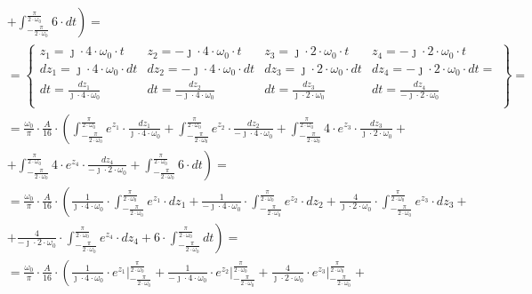 \begin{task}
\begin{align*}
&+\left. \int_{-\frac{\pi}{2\cdot\omega_0}}^{\frac{\pi}{2\cdot\omega_0}} 6\cdot dt \right)=\\
&=\begin{Bmatrix}
z_1=\jmath \cdot 4 \cdot \omega_0 \cdot t & z_2= - \jmath \cdot 4 \cdot \omega_0 \cdot t & z_3=\jmath \cdot 2 \cdot \omega_0 \cdot t & z_4= - \jmath \cdot 2 \cdot \omega_0 \cdot t \\
dz_1=\jmath \cdot 4 \cdot \omega_0 \cdot dt & dz_2= - \jmath \cdot 4 \cdot \omega_0 \cdot dt & dz_3=\jmath \cdot 2 \cdot \omega_0 \cdot dt & dz_4= - \jmath \cdot 2 \cdot \omega_0 \cdot dt=\\
dt=\frac{dz_1}{\jmath \cdot 4 \cdot \omega_0} & dt=\frac{dz_2}{- \jmath \cdot 4 \cdot \omega_0} & dt=\frac{dz_3}{\jmath \cdot 2 \cdot \omega_0} & dt=\frac{dz_4}{- \jmath \cdot 2 \cdot \omega_0} \\
\end{Bmatrix}=\\
&=\frac{\omega_0}{\pi} \cdot \frac{A}{16} \cdot \left( \int_{-\frac{\pi}{2\cdot\omega_0}}^{\frac{\pi}{2\cdot\omega_0}} e^{z_1}\cdot \frac{dz_1}{\jmath \cdot 4 \cdot \omega_0} +\int_{-\frac{\pi}{2\cdot\omega_0}}^{\frac{\pi}{2\cdot\omega_0}} e^{z_2}\cdot \frac{dz_2}{-\jmath \cdot 4 \cdot \omega_0} +\int_{-\frac{\pi}{2\cdot\omega_0}}^{\frac{\pi}{2\cdot\omega_0}} 4\cdot e^{z_3}\cdot \frac{dz_3}{\jmath \cdot 2 \cdot \omega_0} \right.+\\
&\left.+\int_{-\frac{\pi}{2\cdot\omega_0}}^{\frac{\pi}{2\cdot\omega_0}} 4\cdot e^{z_4}\cdot \frac{dz_4}{-\jmath \cdot 2 \cdot \omega_0} + \int_{-\frac{\pi}{2\cdot\omega_0}}^{\frac{\pi}{2\cdot\omega_0}} 6\cdot dt \right)=\\
&=\frac{\omega_0}{\pi} \cdot \frac{A}{16} \cdot \left(\frac{1}{\jmath \cdot 4 \cdot \omega_0} \cdot\int_{-\frac{\pi}{2\cdot\omega_0}}^{\frac{\pi}{2\cdot\omega_0}} e^{z_1}\cdot dz_1 +\frac{1}{-\jmath \cdot 4 \cdot \omega_0}\cdot \int_{-\frac{\pi}{2\cdot\omega_0}}^{\frac{\pi}{2\cdot\omega_0}} e^{z_2}\cdot dz_2 +\frac{4}{\jmath \cdot 2 \cdot \omega_0}\cdot \int_{-\frac{\pi}{2\cdot\omega_0}}^{\frac{\pi}{2\cdot\omega_0}} e^{z_3}\cdot dz_3 \right.+\\
&\left.+\frac{4}{-\jmath \cdot 2 \cdot \omega_0} \cdot \int_{-\frac{\pi}{2\cdot\omega_0}}^{\frac{\pi}{2\cdot\omega_0}} e^{z_4}\cdot dz_4 + 6 \cdot \int_{-\frac{\pi}{2\cdot\omega_0}}^{\frac{\pi}{2\cdot\omega_0}} dt \right)=\\
&=\frac{\omega_0}{\pi} \cdot \frac{A}{16} \cdot \left(\frac{1}{\jmath \cdot 4 \cdot \omega_0} \cdot \left. e^{z_1}\right|_{-\frac{\pi}{2\cdot\omega_0}}^{\frac{\pi}{2\cdot\omega_0}} +\frac{1}{-\jmath \cdot 4 \cdot \omega_0}\cdot \left. e^{z_2}\right|_{-\frac{\pi}{2\cdot\omega_0}}^{\frac{\pi}{2\cdot\omega_0}} +\frac{4}{\jmath \cdot 2 \cdot \omega_0}\cdot \left. e^{z_3}\right|_{-\frac{\pi}{2\cdot\omega_0}}^{\frac{\pi}{2\cdot\omega_0}} \right.+\\

\end{align*}
\end{task}
